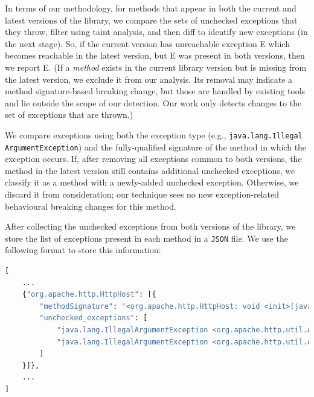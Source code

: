 

In terms of our methodology, for methods that appear in both the current and latest versions of the library, we compare the sets of unchecked exceptions that they throw, filter using taint analysis, and then diff to identify new exceptions (in the next stage). So, if the current version has unreachable exception E which becomes reachable in the latest version, but E was present in both versions, then we report E. (If a \emph{method} exists in the current library version but is missing from the latest version, we exclude it from our analysis. Its removal may indicate a method signature-based breaking change, but those are handled by existing tools and lie outside the scope of our detection. Our work only detects changes to the set of exceptions that are thrown.)

We compare exceptions using both the exception type (e.g., \texttt{java.lang.Illegal\\ArgumentException}) and the fully-qualified signature of the method in which the exception occurs. If, after removing all exceptions common to both versions, the method in the latest version still contains additional unchecked exceptions, we classify it as a method with a newly-added unchecked exception. Otherwise, we discard it from consideration; our technique sees no new exception-related behavioural breaking changes for this method.

After collecting the unchecked exceptions from both versions of the library, we store the list of exceptions present in each method in a \texttt{JSON} file. We use the following format to store this information:
\begin{lstlisting}[language=python]
[
    ...
    {"org.apache.http.HttpHost": [{
        "methodSignature": "<org.apache.http.HttpHost: void <init>(java.lang.String,int)>",
        "unchecked_exceptions": [
            "java.lang.IllegalArgumentException <org.apache.http.util.Args: java.lang.CharSequence containsNoBlanks(java.lang.CharSequence,java.lang.String)>",
            "java.lang.IllegalArgumentException <org.apache.http.util.Args: java.lang.CharSequence containsNoBlanks(java.lang.CharSequence,java.lang.String)>"
        ]
    }]},
    ...
]
\end{lstlisting}

